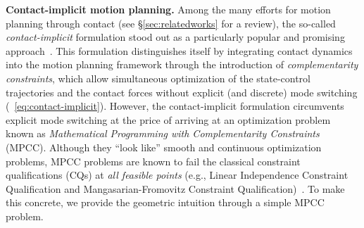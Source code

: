 \textbf{Contact-implicit motion planning.} Among the many efforts for motion planning through contact (see \S\ref{sec:relatedworks} for a review), the so-called \emph{contact-implicit} formulation stood out as a particularly popular and promising approach~\cite{posa2014ijrr-traopt-directmethod-contact,kerim2006TO}. This formulation distinguishes itself by integrating contact dynamics into the motion planning framework through the introduction of \emph{complementarity constraints}, which allow simultaneous optimization of the state-control trajectories and the contact forces without explicit (and discrete) mode switching (\cf~\eqref{eq:contact-implicit}). 
However, the contact-implicit formulation circumvents explicit mode switching at the price of arriving at an optimization problem known as \emph{Mathematical Programming with Complementarity Constraints} (MPCC). Although they ``look like'' smooth and continuous optimization problems, MPCC problems are known to fail the classical constraint qualifications (CQs) at \emph{all feasible points} (e.g., Linear Independence Constraint Qualification and Mangasarian-Fromovitz Constraint Qualification)~\cite{MOR-scheel2000mathematical,SIOPT-Scholtes-2001,SIOPT-Ye-MPCC-2016}. 
To make this concrete, we provide the geometric intuition through a simple MPCC problem.

